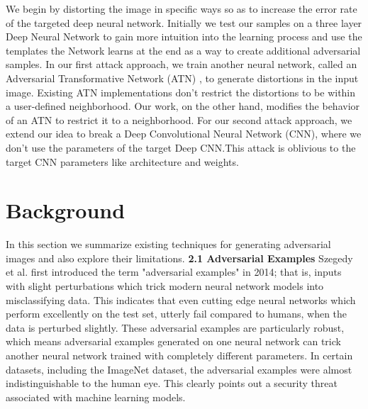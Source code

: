 \documentclass[12pt, conference, letterpaper]{IEEEtran}
\begin{document}
We begin by distorting the image in specific ways so as to increase the error rate of the targeted deep neural network. Initially we test our samples on a three layer Deep Neural Network to gain more intuition into the learning process and use the templates the Network learns at the end as a way to create additional adversarial samples. 
In our first attack approach, we train another neural network, called an Adversarial Transformative Network (ATN) \cite{13}, to generate distortions in the input image. Existing ATN implementations don't restrict the distortions to be within a user-defined neighborhood. Our work, on the other hand, modifies the behavior of an ATN to restrict it to a neighborhood. For our second attack approach, we extend our idea to break a Deep Convolutional Neural Network (CNN), where we don't use the parameters of the target Deep CNN.This attack is oblivious to the target CNN parameters like architecture and weights.

\section{Background}
In this section we summarize existing techniques for generating adversarial images and also explore their limitations. \newline \newline
\textbf{2.1 Adversarial Examples} \newline
\indent Szegedy et al. first introduced the term "adversarial examples" in 2014; that is, inputs with slight perturbations which trick modern neural network models into misclassifying data. \cite{4} This indicates that even cutting edge neural networks which perform excellently on the test set, utterly fail compared to humans, when the data is perturbed slightly. These adversarial examples are particularly robust, which means adversarial examples generated on one neural network can trick another neural network trained with completely different parameters. \cite{5} In certain datasets, including the ImageNet \cite{6} dataset, the adversarial examples were almost indistinguishable to the human eye. This clearly points out a security threat associated with machine learning models. \newline \newline
\end{document}

